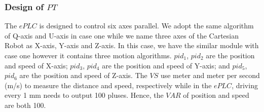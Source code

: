 \documentclass[journal,UTF8]{IEEEtran}
\begin{document}
\subsubsection{Design of $PT$}
The $ePLC$ is designed to control six axes parallel. We adopt the same algorithm of Q-axis and U-axis in case one while we name three axes of the Cartesian Robot as X-axis, Y-axis and Z-axis. In this case, we have the similar module with case one however it contains three motion algorithms. $pid_1$, $pid_2$ are the position and speed of X-axis; $pid_3$, $pid_4$ are the position and speed of Y-axis; and $pid_5$, $pid_6$ are the position and speed of Z-axis. The $VS$ use meter and meter per second (m/s) to measure the distance and speed, respectively while in the $ePLC$, driving every 1 mm needs to output 100 pluses. Hence, the $VAR$ of position and speed are both 100.    
\end{document}
